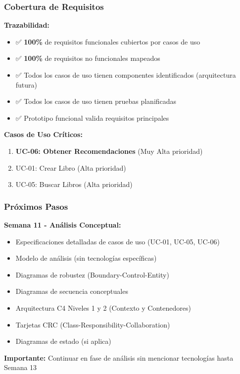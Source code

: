 \documentclass[aspectratio=169]{beamer}
\begin{document}
\begin{frame}
\frametitle{Cobertura de Requisitos}

\textbf{Trazabilidad:}

\begin{itemize}
\item ✅ \textbf{100\%} de requisitos funcionales cubiertos por casos de uso
\item ✅ \textbf{100\%} de requisitos no funcionales mapeados
\item ✅ Todos los casos de uso tienen componentes identificados (arquitectura futura)
\item ✅ Todos los casos de uso tienen pruebas planificadas
\item ✅ Prototipo funcional valida requisitos principales
\end{itemize}

\vspace{0.5cm}

\textbf{Casos de Uso Críticos:}
\begin{enumerate}
\item \textbf{UC-06: Obtener Recomendaciones} (Muy Alta prioridad)
\item UC-01: Crear Libro (Alta prioridad)
\item UC-05: Buscar Libros (Alta prioridad)
\end{enumerate}

\end{frame}

\begin{frame}
\frametitle{Próximos Pasos}

\textbf{Semana 11 - Análisis Conceptual:}

\begin{itemize}
\item Especificaciones detalladas de casos de uso (UC-01, UC-05, UC-06)
\item Modelo de análisis (sin tecnologías específicas)
\item Diagramas de robustez (Boundary-Control-Entity)
\item Diagramas de secuencia conceptuales
\item Arquitectura C4 Niveles 1 y 2 (Contexto y Contenedores)
\item Tarjetas CRC (Class-Responsibility-Collaboration)
\item Diagramas de estado (si aplica)
\end{itemize}

\vspace{0.3cm}

\begin{tcolorbox}[colback=yellow!5, colframe=yellow!50]
\textbf{Importante:} Continuar en fase de análisis sin mencionar tecnologías hasta Semana 13
\end{tcolorbox}

\end{frame}
\end{document}
